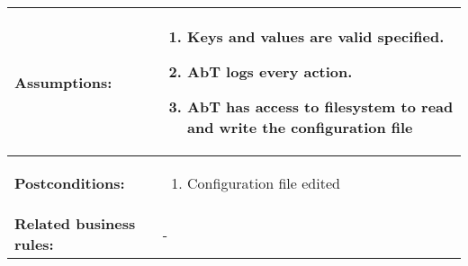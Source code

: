 \begin{tabularx}{\linewidth}{|l|X|}
\hline
\textbf{Assumptions:} & \begin{enumerate} 
							\item Keys and values are valid specified.
							\item AbT logs every action.
							\item AbT has access to filesystem to read and write the configuration file
						\end{enumerate} \\
\hline
\textbf{Postconditions:} & 
  \begin{minipage}{\linewidth}
  \vspace{0.05em}
  \begin{enumerate}
    \item Configuration file edited
  \end{enumerate}
  \vspace{0.05em}
\end{minipage}
\\
\hline
\textbf{Related business rules:} & - \\
\hline
\end{tabularx}


